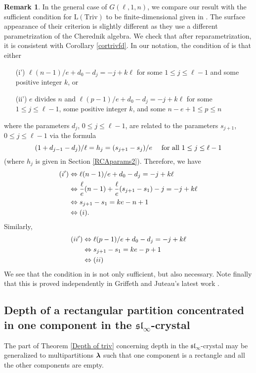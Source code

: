 \documentclass[12pt]{amsart}
\numberwithin{equation}{section}
\theoremstyle{definition}
\newtheorem{remark}[equation]{Remark}
\newcommand{\el}{\mathrm{L}}
\newcommand{\slinf}{\mathfrak{sl}_\infty}
\newcommand{\triv}{\mathrm{Triv}}
\begin{document}
\begin{remark}
In the general case of $G(\ell,1,n)$, we compare our result with the sufficient condition for $\el(\triv)$ to be finite-dimensional given in \cite[Corollary 5.4]{GGJL}. The surface appearance of their criterion is slightly different as they use a different parametrization of the Cherednik algebra. We check that after 
reparametrization, it is consistent with Corollary \ref{cortrivfd}. In our notation, the condition of \cite[Corollary 5.4]{GGJL} is that either
\begin{itemize}
 \item[(i')] $\ell(n-1)/e + d_0-d_j=-j+k\ell$ for some $1\leq j\leq \ell-1$ and some positive integer $k$, or 
 \item[(ii')] $e$ divides $n$ and $\ell(p-1)/e + d_0-d_j=-j+k\ell$ for some $1\leq j\leq \ell-1$, some positive integer $k$, and some $n-e+1\leq p \leq n$
\end{itemize}
where the parameters $d_j$, $0\leq j\leq \ell-1$, are related to the parameters $s_{j+1}$, $0\leq j\leq \ell-1$ via the formula
$$ (1+d_{j-1}-d_j)/\ell = h_j = (s_{j+1}-s_j)/e \text{ \quad for all } 1\leq j\leq \ell-1$$
(where $h_j$ is given in Section \ref{RCAparams2}).
Therefore, we have
\begin{align*}
(i') & \Leftrightarrow  \ell(n-1)/e + d_0-d_j=-j+k\ell \\
& \Leftrightarrow \frac{\ell}{e}(n-1) + \frac{\ell}{e}(s_{j+1}-s_1) -j = -j+k\ell \\
& \Leftrightarrow  s_{j+1}-s_1 = ke -n+1 \\
& \Leftrightarrow  (i).
\end{align*}
Similarly, 
\begin{align*}
(ii') & \Leftrightarrow  \ell(p-1)/e + d_0-d_j=-j+k\ell \\
& \Leftrightarrow  s_{j+1}-s_1 = ke -p+1 \\
& \Leftrightarrow  (ii)
\end{align*}
We see that the condition in \cite[Corollary 5.4]{GGJL} is not only sufficient, but also necessary.
Note finally that this is proved independently in Griffeth and Juteau's latest work \cite{GriffethJuteau2017}.
\end{remark}

\subsection{Depth of a rectangular partition concentrated in one component in the $\slinf$-crystal}
The part of Theorem \ref{Depth of triv} concerning depth in the $\slinf$-crystal may be generalized to multipartitions $\boldsymbol{\lambda}$ such that one component is a rectangle and all the other components are empty.
\end{document}
